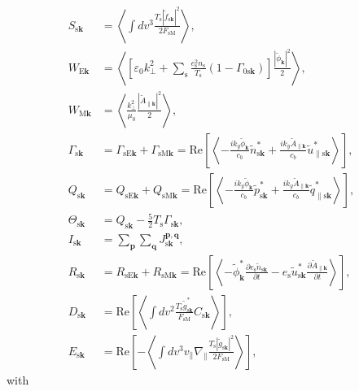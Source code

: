 \begin{align}
  S_{\mathrm{s}\bm{k}} &= \left\langle \int dv^3 \frac{T_\mathrm{s}|\tilde{f}_{\mathrm{s}\bm{k}}|^2}{2F_\mathrm{sM}} \right\rangle, \\
  W_{\mathrm{E}\bm{k}} & = \left\langle \left[ \varepsilon_0 k_\perp^2 + \sum_\mathrm{s} \frac{e_\mathrm{s}^2 n_\mathrm{s}}{T_\mathrm{s}} \left( 1 - \Gamma_{0\mathrm{s}\bm{k}} \right) \right] \frac{|\tilde{\phi}_{\bm{k}}|^2}{2} \right\rangle, \\
  W_{\mathrm{M}\bm{k}} &= \left\langle \frac{k_\perp^2}{\mu_0} \frac{|\tilde{A}_{\parallel\bm{k}}|^2}{2} \right\rangle, \\
  \Gamma_{\mathrm{s}\bm{k}} &= \Gamma_{\mathrm{sE}\bm{k}} + \Gamma_{\mathrm{sM}\bm{k}} = \mathrm{Re}\left[ \left\langle - \frac{ik_y\tilde{\phi}_{\bm{k}}}{c_b}\tilde{n}_{\mathrm{s}\bm{k}}^* + \frac{ik_y\tilde{A}_{\parallel\bm{k}}}{c_b}\tilde{u}_{\parallel\mathrm{s}\bm{k}}^* \right\rangle \right], \\
  Q_{\mathrm{s}\bm{k}} &= Q_{\mathrm{sE}\bm{k}} + Q_{\mathrm{sM}\bm{k}} = \mathrm{Re}\left[ \left\langle - \frac{ik_y\tilde{\phi}_{\bm{k}}}{c_b}\tilde{p}_{\mathrm{s}\bm{k}}^* + \frac{ik_y\tilde{A}_{\parallel\bm{k}}}{c_b}\tilde{q}_{\parallel\mathrm{s}\bm{k}}^* \right\rangle \right], \\
  \Theta_{\mathrm{s}\bm{k}} &= Q_{\mathrm{s}\bm{k}} - \frac{5}{2} T_\mathrm{s} \Gamma_{\mathrm{s}\bm{k}}, \\
  I_{\mathrm{s}\bm{k}} &= \sum_{\bm{p}} \sum_{\bm{q}} J_{\mathrm{s}\bm{k}}^{\bm{p},\bm{q}}, \\
  R_{\mathrm{s}\bm{k}} &= R_{\mathrm{sE}\bm{k}} + R_{\mathrm{sM}\bm{k}} = \mathrm{Re} \left[ \left\langle - \tilde{\phi}_{\bm{k}}^* \frac{\partial e_\mathrm{s}\tilde{n}_{\mathrm{s}\bm{k}}}{\partial t} - e_\mathrm{s} \tilde{u}_{\mathrm{s}\bm{k}}^* \frac{\partial \tilde{A}_{\parallel\bm{k}}}{\partial t} \right\rangle \right], \\
  D_{\mathrm{s}\bm{k}} &= \mathrm{Re} \left[ \left\langle \int dv^2 \frac{T_\mathrm{s}\tilde{g}_{\mathrm{s}\bm{k}}^*}{F_\mathrm{sM}} C_{\mathrm{s}\bm{k}} \right\rangle \right], \\
  E_{\mathrm{s}\bm{k}} &= \mathrm{Re} \left[ - \left\langle \int dv^3 v_\parallel \nabla_\parallel \frac{T_\mathrm{s}|\tilde{g}_{\mathrm{s}\bm{k}}|^2}{2F_\mathrm{sM}} \right\rangle \right],
\end{align}
with
